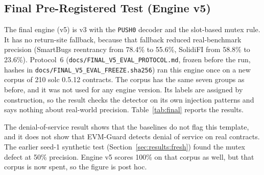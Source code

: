 \documentclass[pdflatex,sn-mathphys]{sn-jnl}
\theoremstyle{thmstyleone}
\theoremstyle{thmstyletwo}
\begin{document}
\subsection{Final Pre-Registered Test (Engine v5)}\label{sec:results:final}
The final engine (v5) is v3 with the \texttt{PUSH0} decoder and the slot-based mutex rule. It has no return-site fallback, because that fallback reduced real-benchmark precision (SmartBugs reentrancy from 78.4\% to 55.6\%, SolidiFI from 58.8\% to 23.6\%). Protocol~6 (\texttt{docs/FINAL\_V5\_EVAL\_PROTOCOL.md}, frozen before the run, hashes in \texttt{docs/FINAL\_V5\_EVAL\_FREEZE.sha256}) ran this engine once on a new corpus of 210 solc 0.5.12 contracts. The corpus has the same seven groups as before, and it was not used for any engine version. Its labels are assigned by construction, so the result checks the detector on its own injection patterns and says nothing about real-world precision. Table~\ref{tab:final} reports the results.

\begin{table}[t]
\centering
\small
\caption{Final pre-registered test (210 Solidity 0.5.12 contracts, synthetic). Recall, precision and FPR with exact 95\% Clopper--Pearson intervals. Mythril had 12 timeouts and 1 error, which count as unflagged.}
\label{tab:final}
\end{table}

The denial-of-service result shows that the baselines do not flag this template, and it does not show that EVM-Guard detects denial of service on real contracts. The earlier seed-1 synthetic test (Section~\ref{sec:results:fresh}) found the mutex defect at 50\% precision. Engine v5 scores 100\% on that corpus as well, but that corpus is now spent, so the figure is post hoc.
\end{document}
